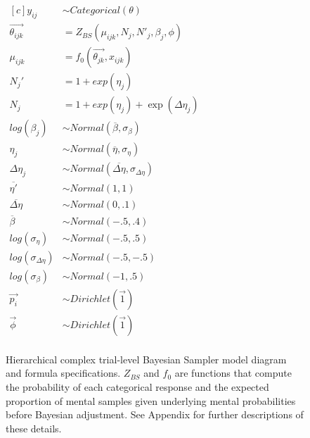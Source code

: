 \begin{figure}
\begin{minipage}{.5\textwidth}
  \end{minipage}%
  \begin{minipage}{.5\textwidth}
    \centering
    $
\begin{aligned}[c]
  y_{ij} &\sim Categorical(\theta) \\
  \overrightarrow{\theta_{ijk}} &= Z_{BS}(\mu_{ijk}, N_j, N'_j, \beta_j, \phi) \\
  \mu_{ijk} &= f_0(\overrightarrow{\theta_{jk}}, x_{ijk})  \\
  N_j' &= 1 + exp(\eta_j) \\
  N_j &= 1 + exp(\eta_j) + \exp(\Delta\eta_j) \\
  log(\beta_j) &\sim Normal(\overline{\beta}, \sigma_{\beta}) \\
  \eta_j &\sim Normal(\overline{\eta}, \sigma_{\eta}) \\ 
  \Delta\eta_j &\sim Normal(\overline{\Delta\eta}, \sigma_{\Delta\eta}) \\
  \overline{\eta'} &\sim Normal(1, 1) \\
  \overline{\Delta\eta} &\sim Normal(0, .1) \\
  \overline{\beta} &\sim Normal(-.5, .4) \\
  log(\sigma_{\eta}) &\sim Normal(-.5, .5) \\
  log(\sigma_{\Delta\eta}) &\sim Normal(-.5, -.5) \\
  log(\sigma_{\beta}) &\sim Normal(-1, .5) \\
  \overrightarrow{p_i} &\sim Dirichlet(\overrightarrow{1}) \\
  \overrightarrow{\phi} &\sim Dirichlet(\overrightarrow{1}) \\
\end{aligned}
$
  \end{minipage}
  \caption{Hierarchical complex trial-level Bayesian Sampler model diagram and formula specifications. $Z_{BS}$ and $f_{0}$ are functions that compute the probability of each categorical response and the expected proportion of mental samples given underlying mental probabilities before Bayesian adjustment. See Appendix for further descriptions of these details.}
\end{figure}